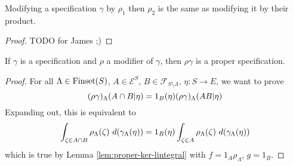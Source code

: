 \begin{lemma}
    \label{lem:modif-modif}
    \leanok{}

    Modifying a specification $\gamma$ by $\rho_1$ then $\rho_2$ is the same as modifying it by their product.
\end{lemma}
\begin{proof}

    TODO for James ;)
\end{proof}


\begin{lemma}
    \label{lem:modif-proper}
    \leanok{}

    If $\gamma$ is a specification and $\rho$ a modifier of $\gamma$, then $\rho\gamma$ is a proper specification.
\end{lemma}
\begin{proof}
    \leanok

    For all $\Lambda \in \operatorname{Finset}(S)$, $A \in \mathcal E^S$, $B \in \mathcal{F}_{S\setminus\Lambda}$, $\eta : S \to E$, we want to prove
    $$(\rho\gamma)_\Lambda(A \cap B | \eta) = 1_B(\eta) (\rho\gamma)_\Lambda(A B | \eta)$$
    Expanding out, this is equivalent to
    $$\int_{\zeta \in A \inter B} \rho_\Lambda(\zeta)\ d(\gamma_\Lambda(\eta)) = 1_B(\eta) \int_{\zeta \in A} \rho_\Lambda(\zeta)\ d(\gamma_\Lambda(\eta))$$
    which is true by Lemma \ref{lem:proper-ker-lintegral} with $f = 1_A\rho_\Lambda$, $g = 1_B$.
\end{proof}





